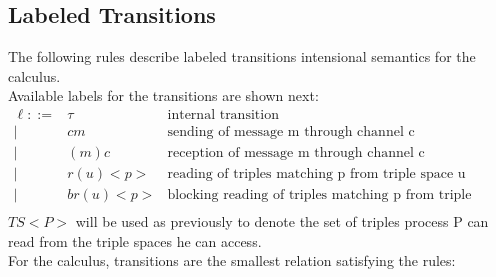 \subsection{Labeled Transitions}
The following rules describe labeled transitions intensional semantics for the calculus.\\
Available labels for the transitions are shown next:
\begin{eqnarray*}
  \ell  ::= & \tau & \mbox{internal transition} \\
        |    &  cm  & \mbox{sending of message m through channel c} \\
        |    & (m)c  & \mbox{reception of message m through channel c} \\
        |    & r(u)<p>  & \mbox{reading of triples matching p from triple space u} \\
        |    & br(u)<p>  & \mbox{blocking reading of triples matching p from triple space u} \\
\end{eqnarray*}
$TS<P>$ will be used as previously to denote the set of triples process P can read from the triple spaces he can access.\\
For the calculus, transitions are the smallest relation satisfying the rules:

